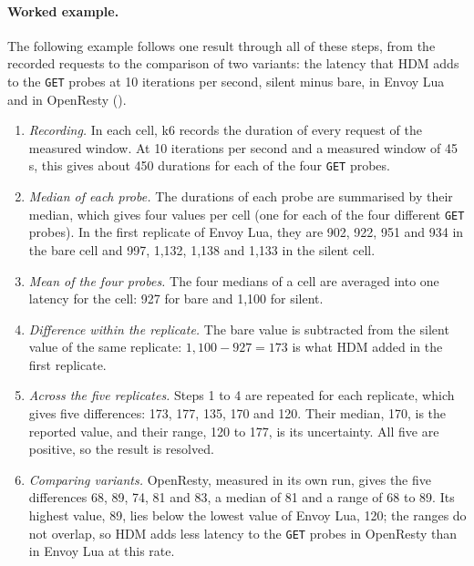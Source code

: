 \documentclass{rptuma}
\begin{document}
\paragraph{Worked example.} The following example follows one result through all of these steps,
from the recorded requests to the comparison of two variants: the latency that HDM adds to the
\texttt{GET} probes at 10 iterations per second, silent minus bare, in Envoy Lua and in OpenResty ().
\begin{enumerate}
  \item \emph{Recording.} In each cell, k6 records the duration of every request of the measured
    window. At 10 iterations per second and a measured window of 45\,s, this gives about 450
    durations for each of the four \texttt{GET} probes.
  \item \emph{Median of each probe.} The durations of each probe are summarised by their median,
    which gives four values per cell (one for each of the four different \texttt{GET} probes). In
    the first replicate of Envoy Lua, they are 902, 922, 951
    and 934\us{} in the bare cell and 997, 1,132, 1,138 and 1,133\us{} in the silent cell.
  \item \emph{Mean of the four probes.} The four medians of a cell are averaged into one latency
    for the cell: 927\us{} for bare and 1,100\us{} for silent.
  \item \emph{Difference within the replicate.} The bare value is subtracted from the silent value
    of the same replicate: $1{,}100 - 927 = 173$\us{} is what HDM added in the first replicate.
  \item \emph{Across the five replicates.} Steps 1 to 4 are repeated for each replicate, which gives
    five differences: 173, 177, 135, 170 and 120\us. Their median, 170\us, is the reported value,
    and their range, 120 to 177\us, is its uncertainty. All five are positive, so the result is
    resolved.
  \item \emph{Comparing variants.} OpenResty, measured in its own run, gives the five
    differences 68, 89, 74, 81 and 83\us, a median of 81\us{} and a range of 68 to 89\us. Its highest
    value, 89\us, lies below the lowest value of Envoy Lua, 120\us; the ranges do not overlap, so HDM
    adds less latency to the \texttt{GET} probes in OpenResty than in Envoy Lua at this rate.
\end{enumerate}
\end{document}

